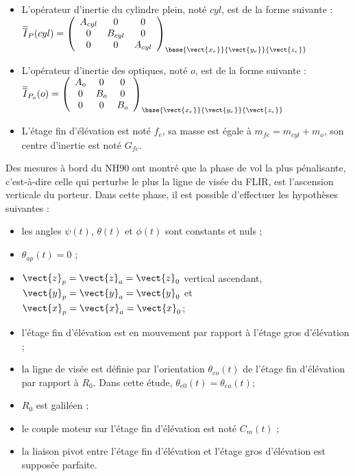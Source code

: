 \begin{itemize}
\item L'opérateur d'inertie du cylindre plein, noté $cyl$, est de la forme suivante :
$
\overline{\overline{I}}_P(cyl)=
\left(
\begin{array}{ccc}
A_{cyl} & 0 & 0 \\ 
0 & B_{cyl} & 0 \\ 
0 & 0 & A_{cyl}
\end{array}
\right)_{\base{\vect{x_e}}{\vect{y_e}}{\vect{z_e}}} 
$
\item L'opérateur d'inertie des optiques, noté $o$, est de la forme suivante :
$
\overline{\overline{I}}_{P_o}(o)=
\left(
\begin{array}{ccc}
A_{o} & 0 & 0 \\ 
0 & B_{o} & 0 \\ 
0 & 0 & B_{o}
\end{array}
\right)_{\base{\vect{x_e}}{\vect{y_e}}{\vect{z_e}}} 
$
\item L'étage fin d'élévation est noté $f_e$, sa masse est égale à $m_{fe}=m_{cyl}+m_o$, son centre d'inertie est noté $G_{fe}$.
\end{itemize}


Des mesures à bord du NH90 ont montré que la phase de vol la plus pénalisante, c'est-à-dire celle qui perturbe
le plus la ligne de visée du FLIR, est l'ascension verticale du porteur. Dans cette phase, il est possible d'effectuer
les hypothèses suivantes :
\begin{itemize}
\item les angles $\psi(t)$, $\theta(t)$ et $\phi(t)$ sont constants et nuls ;
\item $\theta_{ap}(t)=0$ ;
\item $\vect{z}_p=\vect{z}_a=\vect{z}_0$ vertical ascendant, $\vect{y}_p=\vect{y}_a=\vect{y}_0$ et $\vect{x}_p=\vect{x}_a=\vect{x}_0$;
\item l'étage fin d'élévation est en mouvement par rapport à l'étage gros d'élévation ;
\item la ligne de visée est définie par l'orientation $\theta_{eo}(t)$ de l'étage fin d'élévation par rapport à $R_0$. Dans cette
étude, $\theta_{e0}(t)=\theta_{ea}(t)$;
\item $R_0$ est galiléen ;
\item le couple moteur sur l'étage fin d'élévation est noté $C_m(t)$ ;
\item la liaison pivot entre l'étage fin d'élévation et l'étage gros d'élévation est supposée parfaite.
\end{itemize}

